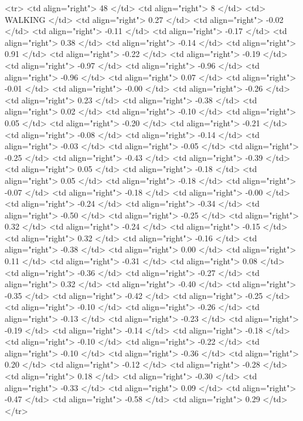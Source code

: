   <tr> <td align="right"> 48 </td> <td align="right">   8 </td> <td> WALKING </td> <td align="right"> 0.27 </td> <td align="right"> -0.02 </td> <td align="right"> -0.11 </td> <td align="right"> -0.17 </td> <td align="right"> 0.38 </td> <td align="right"> -0.14 </td> <td align="right"> 0.91 </td> <td align="right"> -0.22 </td> <td align="right"> -0.19 </td> <td align="right"> -0.97 </td> <td align="right"> -0.96 </td> <td align="right"> -0.96 </td> <td align="right"> 0.07 </td> <td align="right"> -0.01 </td> <td align="right"> -0.00 </td> <td align="right"> -0.26 </td> <td align="right"> 0.23 </td> <td align="right"> -0.38 </td> <td align="right"> 0.02 </td> <td align="right"> -0.10 </td> <td align="right"> 0.05 </td> <td align="right"> -0.20 </td> <td align="right"> -0.21 </td> <td align="right"> -0.08 </td> <td align="right"> -0.14 </td> <td align="right"> -0.03 </td> <td align="right"> -0.05 </td> <td align="right"> -0.25 </td> <td align="right"> -0.43 </td> <td align="right"> -0.39 </td> <td align="right"> 0.05 </td> <td align="right"> -0.18 </td> <td align="right"> 0.05 </td> <td align="right"> -0.18 </td> <td align="right"> -0.07 </td> <td align="right"> -0.18 </td> <td align="right"> -0.00 </td> <td align="right"> -0.24 </td> <td align="right"> -0.34 </td> <td align="right"> -0.50 </td> <td align="right"> -0.25 </td> <td align="right"> 0.32 </td> <td align="right"> -0.24 </td> <td align="right"> -0.15 </td> <td align="right"> 0.32 </td> <td align="right"> -0.16 </td> <td align="right"> -0.38 </td> <td align="right"> 0.00 </td> <td align="right"> 0.11 </td> <td align="right"> -0.31 </td> <td align="right"> 0.08 </td> <td align="right"> -0.36 </td> <td align="right"> -0.27 </td> <td align="right"> 0.32 </td> <td align="right"> -0.40 </td> <td align="right"> -0.35 </td> <td align="right"> -0.42 </td> <td align="right"> -0.25 </td> <td align="right"> -0.10 </td> <td align="right"> -0.26 </td> <td align="right"> -0.13 </td> <td align="right"> -0.23 </td> <td align="right"> -0.19 </td> <td align="right"> -0.14 </td> <td align="right"> -0.18 </td> <td align="right"> -0.10 </td> <td align="right"> -0.22 </td> <td align="right"> -0.10 </td> <td align="right"> -0.36 </td> <td align="right"> 0.20 </td> <td align="right"> -0.12 </td> <td align="right"> -0.28 </td> <td align="right"> 0.18 </td> <td align="right"> -0.30 </td> <td align="right"> -0.33 </td> <td align="right"> 0.09 </td> <td align="right"> -0.47 </td> <td align="right"> -0.58 </td> <td align="right"> 0.29 </td> </tr>
